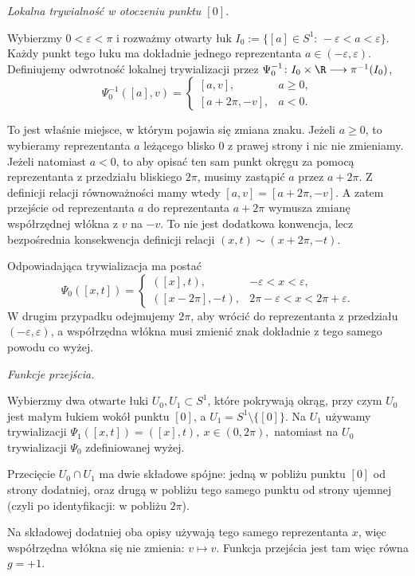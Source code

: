 \begin{przyklad}
\medskip
\emph{Lokalna trywialność w otoczeniu punktu $[0]$.}

Wybierzmy
$
0<\varepsilon<\pi
$
i rozważmy otwarty łuk
$
I_0:=\{[a]\in S^1:\,-\varepsilon<a<\varepsilon\}.
$
Każdy punkt tego łuku ma dokładnie jednego reprezentanta
$
a\in(-\varepsilon,\varepsilon).
$
Definiujemy odwrotność lokalnej trywializacji przez $\Psi_0^{-1}\colon I_0\times\R\longrightarrow \pi^{-1}(I_0)$,
\[
\Psi_0^{-1}([a],v)=
\begin{cases}
[a,v],& a\ge 0,\\[1mm]
[a+2\pi,-v],& a<0.
\end{cases}
\]

To jest właśnie miejsce, w którym pojawia się zmiana znaku.
Jeżeli $a\ge 0$, to wybieramy reprezentanta $a$ leżącego blisko $0$
z prawej strony i nic nie zmieniamy.
Jeżeli natomiast $a<0$, to aby opisać ten sam punkt okręgu za pomocą
reprezentanta z przedziału bliskiego $2\pi$, musimy zastąpić $a$
przez $a+2\pi$. Z definicji relacji równoważności mamy wtedy
$
[a,v]=[a+2\pi,-v].
$
A zatem przejście od reprezentanta $a$ do reprezentanta $a+2\pi$
wymusza zmianę współrzędnej włókna z $v$ na $-v$.
To nie jest dodatkowa konwencja, lecz bezpośrednia konsekwencja definicji
relacji
$
(x,t)\sim(x+2\pi,-t).
$

Odpowiadająca trywializacja ma postać
\[
\Psi_0([x,t])=
\begin{cases}
([x],t),& -\varepsilon<x<\varepsilon,\\[1mm]
([x-2\pi],-t),& 2\pi-\varepsilon<x<2\pi+\varepsilon.
\end{cases}
\]
W drugim przypadku odejmujemy $2\pi$, aby wrócić do reprezentanta
z przedziału $(-\varepsilon,\varepsilon)$, a współrzędna włókna
musi zmienić znak dokładnie z tego samego powodu co wyżej.

\medskip
\emph{Funkcje przejścia.}

Wybierzmy dwa otwarte łuki $U_0,U_1\subset S^1$, które pokrywają okrąg,
przy czym $U_0$ jest małym łukiem wokół punktu $[0]$, a $U_1=S^1\setminus\{[0]\}$.
Na $U_1$ używamy trywializacji
$
\Psi_1([x,t])=([x],t),
\ x\in(0,2\pi),
$
natomiast na $U_0$ trywializacji $\Psi_0$ zdefiniowanej wyżej.

Przecięcie $U_0\cap U_1$ ma dwie składowe spójne:
jedną w pobliżu punktu $[0]$ od strony dodatniej,
oraz drugą w pobliżu tego samego punktu od strony ujemnej
(czyli po identyfikacji: w pobliżu $2\pi$).

Na składowej dodatniej oba opisy używają tego samego reprezentanta $x$,
więc współrzędna włókna się nie zmienia:
$
v\longmapsto v.
$
Funkcja przejścia jest tam więc równa
$
g=+1.
$


\end{przyklad}
